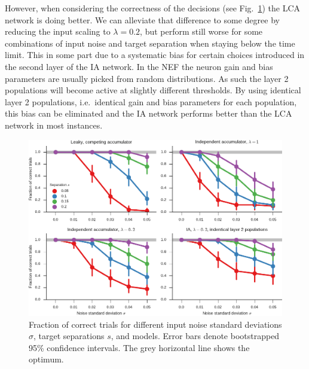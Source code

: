 \documentclass[10pt,letterpaper]{article}
\begin{document}
However, when considering the correctness of the decisions (see Fig.~\ref{fig:correct}) the LCA network is doing better.
We can alleviate that difference to some degree by reducing the input scaling to $\lambda = 0.2$, but perform still worse for some combinations of input noise and target separation when staying below the time limit.
This in some part due to a systematic bias for certain choices introduced in the second layer of the IA network.
In the NEF the neuron gain and bias parameters are usually picked from random distributions.
As such the layer 2 populations will become active at slightly different thresholds.
By using identical layer 2 populations, i.e.~identical gain and bias parameters for each population, this bias can be eliminated and the IA network performs better than the LCA network in most instances.
\begin{figure}
    \centering
    \includegraphics{figures/correct}
    \caption{ \label{fig:correct}
        Fraction of correct trials for different input noise standard deviations $\sigma$, target separations $s$, and models.  
        Error bars denote bootstrapped 95\% confidence intervals.
        The grey horizontal line shows the optimum.
    }
\end{figure}
\end{document}
